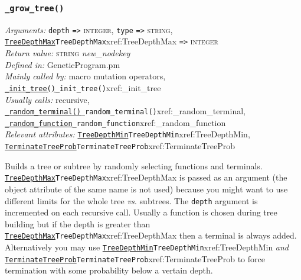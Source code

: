 \documentclass[a4paper]{article}
\begin{document}
\subsubsection{\texttt{\_grow\_tree()}}\label{xref:_grow_tree}
\begin{flushleft}
\textit{Arguments:} \texttt{depth} \verb:=>: \textsc{integer},
\texttt{type} \verb:=>: \textsc{string},
\hyperref[no]{\texttt{TreeDepthMax}}{\texttt{TreeDepthMax}}{xref:TreeDepthMax} \verb:=>: \textsc{integer} \\
\textit{Return value:} \textsc{string} \textit{new\_nodekey}\\
\textit{Defined in:} GeneticProgram.pm\\
\textit{Mainly called by:} macro mutation operators, \hyperref[no]{\texttt{\_init\_tree()}}{\texttt{\_init\_tree()}}{xref:_init_tree}\\
\textit{Usually calls:} recursive, \hyperref[no]{\texttt{\_random\_terminal()}}{\texttt{\_random\_terminal()}}{xref:_random_terminal}, \hyperref[no]{\texttt{\_random\_function}}{\texttt{\_random\_function}}{xref:_random_function}\\
\textit{Relevant attributes:} \hyperref[no]{\texttt{TreeDepthMin}}{\texttt{TreeDepthMin}}{xref:TreeDepthMin}, \hyperref[no]{\texttt{TerminateTreeProb}}{\texttt{TerminateTreeProb}}{xref:TerminateTreeProb}
\end{flushleft}

Builds a tree or subtree by randomly selecting functions and
terminals.  \hyperref[no]{\texttt{TreeDepthMax}}{\texttt{TreeDepthMax}}{xref:TreeDepthMax} is passed as an argument (the object
attribute of the same name is not used) because you might want to use
different limits for the whole tree \textit{vs.} subtrees.  The
\texttt{depth} argument is incremented on each recursive call.
Usually a function is chosen during tree building but if the depth is
greater than \hyperref[no]{\texttt{TreeDepthMax}}{\texttt{TreeDepthMax}}{xref:TreeDepthMax} then a terminal is always added.
Alternatively you may use \hyperref[no]{\texttt{TreeDepthMin}}{\texttt{TreeDepthMin}}{xref:TreeDepthMin} \textit{and}
\hyperref[no]{\texttt{TerminateTreeProb}}{\texttt{TerminateTreeProb}}{xref:TerminateTreeProb} to force termination with some probability
below a vertain depth.
\end{document}
